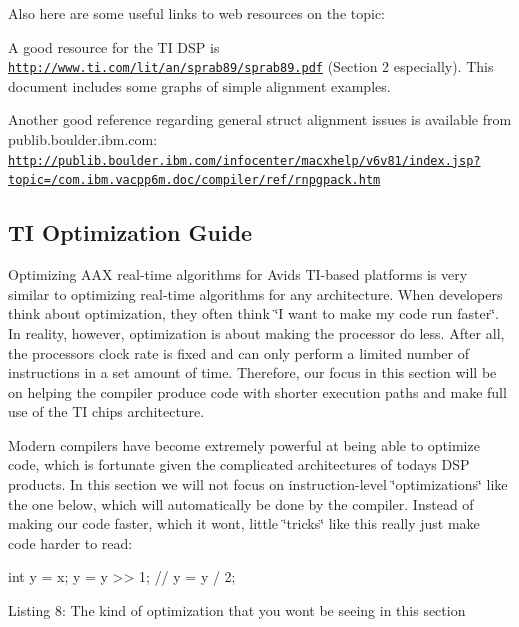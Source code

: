 Also here are some useful links to web resources on the topic\+: 
\begin{DoxyItemize}
\item  A good resource for the T\+I D\+S\+P is \href{http://www.ti.com/lit/an/sprab89/sprab89.pdf}{\tt http\+://www.\+ti.\+com/lit/an/sprab89/sprab89.\+pdf} (Section 2 especially). This document includes some graphs of simple alignment examples.  


\item  Another good reference regarding general struct alignment issues is available from publib.\+boulder.\+ibm.\+com\+: \href{http://publib.boulder.ibm.com/infocenter/macxhelp/v6v81/index.jsp?topic=/com.ibm.vacpp6m.doc/compiler/ref/rnpgpack.htm}{\tt http\+://publib.\+boulder.\+ibm.\+com/infocenter/macxhelp/v6v81/index.\+jsp?topic=/com.\+ibm.\+vacpp6m.\+doc/compiler/ref/rnpgpack.\+htm}   
\end{DoxyItemize}



 \hypertarget{a00362_aax_ti_guide_06_ti_optimization_guide}{}\subsection{T\+I Optimization Guide}\label{a00362_aax_ti_guide_06_ti_optimization_guide}
Optimizing A\+A\+X real-\/time algorithms for Avid\textquotesingle{}s T\+I-\/based platforms is very similar to optimizing real-\/time algorithms for any architecture. When developers think about optimization, they often think \char`\"{}\+I want to make my code run faster\char`\"{}. In reality, however, optimization is about making the processor do less. After all, the processor\textquotesingle{}s clock rate is fixed and can only perform a limited number of instructions in a set amount of time. Therefore, our focus in this section will be on helping the compiler produce code with shorter execution paths and make full use of the T\+I chip\textquotesingle{}s architecture.

Modern compilers have become extremely powerful at being able to optimize code, which is fortunate given the complicated architectures of today\textquotesingle{}s D\+S\+P products. In this section we will not focus on instruction-\/level \char`\"{}optimizations\char`\"{} like the one below, which will automatically be done by the compiler. Instead of making our code faster, which it won\textquotesingle{}t, little \char`\"{}tricks\char`\"{} like this really just make code harder to read\+:


\begin{DoxyCode}
\textcolor{keywordtype}{int} y = x;
y = y >> 1; \textcolor{comment}{// y = y / 2; }
\end{DoxyCode}
  Listing 8\+: The kind of optimization that you won\textquotesingle{}t be seeing in this section

